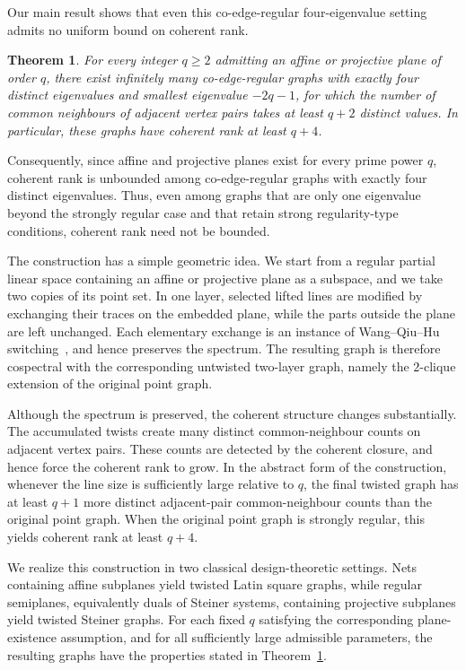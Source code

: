 \documentclass[reqno,a4paper,11pt]{article}
\newtheorem{thm}{Theorem}[section]
\theoremstyle{definition}
\theoremstyle{remark}
\begin{document}
  
  Our main result shows that even this co-edge-regular four-eigenvalue setting admits no uniform bound on coherent rank.
  
\begin{thm}\label{thm:intro-main}
	For every integer \(q\ge2\) admitting an affine or projective plane of order \(q\), there exist infinitely many co-edge-regular graphs with exactly four distinct eigenvalues and smallest eigenvalue \(-2q-1\), for which the number of common neighbours of adjacent vertex pairs takes at least \(q+2\) distinct values. 
	In particular, these graphs have coherent rank at least \(q+4\).
\end{thm}

Consequently,  since  affine and projective planes exist for every prime power \(q\), coherent rank is unbounded among co-edge-regular  graphs with exactly four distinct eigenvalues.
Thus, even among graphs that are only one eigenvalue beyond the strongly regular case and that retain strong regularity-type conditions, coherent rank need not be bounded.

The construction has a simple geometric idea.
 We start from a regular partial linear space containing an affine or projective plane as a subspace, and we take two copies of its point set. In one layer, selected lifted lines are modified by exchanging their traces on the embedded plane, while the parts outside the plane are left unchanged. Each elementary exchange is an instance of Wang--Qiu--Hu switching~\cite{WQH2019}, and hence preserves the spectrum. The resulting graph is therefore cospectral with the corresponding untwisted two-layer graph, namely the \(2\)-clique extension of the original point graph.

Although the spectrum is preserved, the coherent structure changes substantially. The accumulated twists create many distinct common-neighbour counts on adjacent vertex pairs. These counts are detected by the coherent closure, and hence force the coherent rank to grow. In the abstract form of the construction, whenever the line size is sufficiently large relative to \(q\), the final twisted graph has at least \(q+1\) more distinct adjacent-pair common-neighbour counts than the original point graph. When the original point graph is strongly regular, this yields coherent rank at least \(q+4\).




We realize this construction in two classical design-theoretic settings.  
Nets containing affine subplanes yield twisted Latin square graphs, while regular semiplanes, equivalently duals of Steiner systems, containing projective subplanes yield twisted Steiner graphs. 
For each fixed \(q\) satisfying the corresponding plane-existence assumption, and for all sufficiently large admissible parameters, the resulting graphs have the properties stated in Theorem~\ref{thm:intro-main}.
\end{document}
